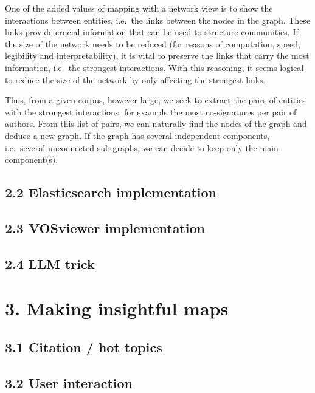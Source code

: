 \documentclass[
]{article}
\begin{document}
One of the added values of mapping with a network view is to show the
interactions between entities, i.e.~the links between the nodes in the
graph. These links provide crucial information that can be used to
structure communities. If the size of the network needs to be reduced
(for reasons of computation, speed, legibility and interpretability), it
is vital to preserve the links that carry the most information, i.e.~the
strongest interactions. With this reasoning, it seems logical to reduce
the size of the network by only affecting the strongest links.

Thus, from a given corpus, however large, we seek to extract the pairs
of entities with the strongest interactions, for example the most
co-signatures per pair of authors. From this list of pairs, we can
naturally find the nodes of the graph and deduce a new graph. If the
graph has several independent components, i.e.~several unconnected
sub-graphs, we can decide to keep only the main component(s).

\hypertarget{elasticsearch-implementation}{%
\subsection{2.2 Elasticsearch
implementation}\label{elasticsearch-implementation}}

\hypertarget{vosviewer-implementation}{%
\subsection{2.3 VOSviewer
implementation}\label{vosviewer-implementation}}

\hypertarget{llm-trick}{%
\subsection{2.4 LLM trick}\label{llm-trick}}

\hypertarget{making-insightful-maps}{%
\section{3. Making insightful maps}\label{making-insightful-maps}}

\hypertarget{citation-hot-topics}{%
\subsection{3.1 Citation / hot topics}\label{citation-hot-topics}}

\hypertarget{user-interaction}{%
\subsection{3.2 User interaction}\label{user-interaction}}
\end{document}
